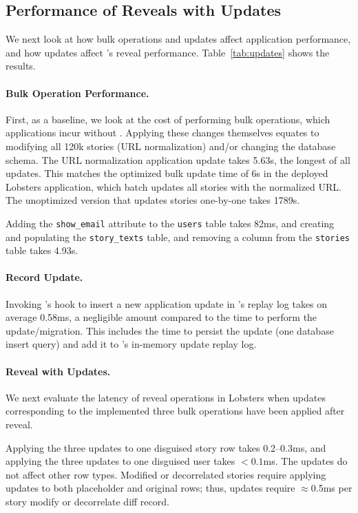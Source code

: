 \subsection{Performance of Reveals with Updates}
\label{s:eval:updates}

We next look at how bulk operations and updates affect application performance,
and how updates affect \sys's reveal performance. Table~\ref{tab:updates} shows
the results.

\paragraph{Bulk Operation Performance.}
First, as a baseline, we look at the cost of performing bulk operations, which applications
incur without \sys.
%
Applying these changes themselves equates to modifying all 120k stories (\eg URL 
normalization) and/or changing the database schema.  The URL normalization
application update takes 5.63s, the longest of all updates.
%
This matches the optimized bulk update time of 6s in the deployed Lobsters
application, which batch updates all stories with the normalized URL. The
unoptimized version that updates stories one-by-one takes 1789s.
%

Adding the \texttt{show\_email} attribute to the \texttt{users} table takes
82ms, and 
%
creating and populating the \texttt{story\_texts} table, and removing a column
from the \texttt{stories} table takes 4.93s.
%

%
\paragraph{Record Update.}
%
Invoking \sys's hook to insert a new application update in \sys's replay log
takes on average 0.58ms, a negligible amount compared to the time to perform the
update/migration. This includes the time to persist the update (one database
insert query) and add it to \sys's in-memory update replay log.
%

%
\paragraph{Reveal with Updates.}
%
We next evaluate the latency of reveal operations in Lobsters when updates
corresponding to the implemented three bulk operations have been applied after
reveal.
%

%
Applying the three updates to one disguised story row takes 0.2--0.3ms, and
applying the three updates to one disguised user takes $<0.1$ms.
%
The updates do not affect other row types.
%
Modified or decorrelated stories require applying updates to both placeholder
and original rows; thus, updates require $\approx$0.5ms per story modify or
decorrelate diff record.
%

